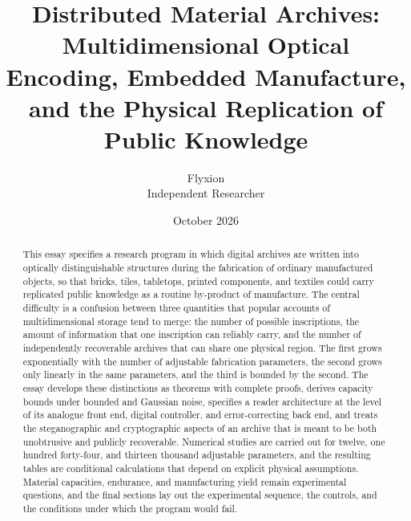 \documentclass[11pt]{article}
\title{Distributed Material Archives:\\
Multidimensional Optical Encoding, Embedded Manufacture,\\
and the Physical Replication of Public Knowledge}
\author{Flyxion\\Independent Researcher}
\date{October 2026}
\theoremstyle{definition}
\theoremstyle{remark}
\begin{document}
\maketitle

\begin{abstract}
\noindent This essay specifies a research program in which digital archives are written into optically distinguishable structures during the fabrication of ordinary manufactured objects, so that bricks, tiles, tabletops, printed components, and textiles could carry replicated public knowledge as a routine by-product of manufacture. The central difficulty is a confusion between three quantities that popular accounts of multidimensional storage tend to merge: the number of possible inscriptions, the amount of information that one inscription can reliably carry, and the number of independently recoverable archives that can share one physical region. The first grows exponentially with the number of adjustable fabrication parameters, the second grows only linearly in the same parameters, and the third is bounded by the second. The essay develops these distinctions as theorems with complete proofs, derives capacity bounds under bounded and Gaussian noise, specifies a reader architecture at the level of its analogue front end, digital controller, and error-correcting back end, and treats the steganographic and cryptographic aspects of an archive that is meant to be both unobtrusive and publicly recoverable. Numerical studies are carried out for twelve, one hundred forty-four, and thirteen thousand adjustable parameters, and the resulting tables are conditional calculations that depend on explicit physical assumptions. Material capacities, endurance, and manufacturing yield remain experimental questions, and the final sections lay out the experimental sequence, the controls, and the conditions under which the program would fail.
\end{abstract}

\tableofcontents
\newpage






\end{document}
